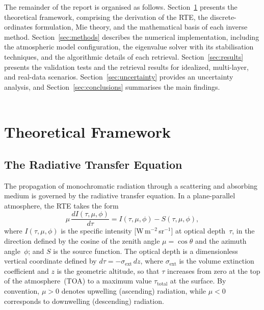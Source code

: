 \documentclass[a4paper, 11pt]{article}
\begin{document}
The remainder of the report is organised as follows.
Section~\ref{sec:theory} presents the theoretical framework,
comprising the derivation of the RTE, the discrete-ordinates
formulation, Mie theory, and the mathematical basis of each inverse
method.  Section~\ref{sec:methods} describes the numerical
implementation, including the atmospheric model configuration, the
eigenvalue solver with its stabilisation techniques, and the algorithmic
details of each retrieval.  Section~\ref{sec:results} presents the
validation tests and the retrieval results for idealized, multi-layer,
and real-data scenarios.
Section~\ref{sec:uncertainty} provides an uncertainty analysis,
and Section~\ref{sec:conclusions} summarises the main findings.
\\
\\

\section{Theoretical Framework}
\label{sec:theory}

\subsection{The Radiative Transfer Equation}
\label{sec:rte}

The propagation of monochromatic radiation through a scattering and
absorbing medium is governed by the radiative transfer equation.  In a
plane-parallel atmosphere, the RTE takes the form
\cite{chandrasekhar1950,thomas2002,disortreport}
%
\begin{equation}
  \mu\,\frac{dI(\tau,\mu,\phi)}{d\tau}
  = I(\tau,\mu,\phi) - S(\tau,\mu,\phi),
  \label{eq:rte}
\end{equation}
%
where $I(\tau,\mu,\phi)$ is the specific intensity
[W\,m$^{-2}$\,sr$^{-1}$] at optical depth~$\tau$, in the direction
defined by the cosine of the zenith angle $\mu = \cos\theta$ and the
azimuth angle~$\phi$; and $S$ is the source function.  The optical
depth is a dimensionless vertical coordinate defined by
$d\tau = -\sigma_{\text{ext}}\,dz$, where $\sigma_{\text{ext}}$ is the
volume extinction coefficient and $z$ is the geometric altitude, so
that $\tau$ increases from zero at the top of the atmosphere~(TOA)
to a maximum value $\tau_{\text{total}}$ at the surface.  By convention,
$\mu > 0$ denotes upwelling (ascending) radiation, while $\mu < 0$
corresponds to downwelling (descending) radiation.
\end{document}
